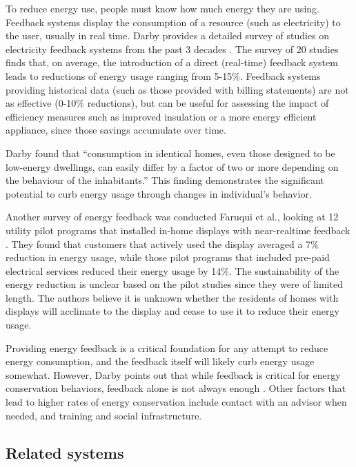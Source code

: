 To reduce energy use, people must know how much energy they are using. Feedback systems display the consumption of a resource (such as electricity) to the user, usually in real time. Darby provides a detailed survey of studies on electricity feedback systems from the past 3 decades \cite{darby-review-2006}. The survey of 20 studies finds that, on average, the introduction of a direct (real-time) feedback system leads to reductions of energy usage ranging from 5-15\%. Feedback systems providing historical data (such as those provided with billing statements) are not as effective (0-10\% reductions), but can be useful for assessing the impact of efficiency measures such as improved insulation or a more energy efficient appliance, since those savings accumulate over time.

Darby found that ``consumption in identical homes, even those designed to be low-energy dwellings, can easily differ by a factor of two or more depending on the behaviour of the inhabitants.'' This finding demonstrates the significant potential to curb energy usage through changes in individual's behavior.

Another survey of energy feedback was conducted Faruqui et al., looking at 12 utility pilot programs that installed in-home displays with near-realtime feedback \cite{Faruqui09}. They found that customers that actively used the display averaged a 7\% reduction in energy usage, while those pilot programs that included pre-paid electrical services reduced their energy usage by 14\%. The sustainability of the energy reduction is unclear based on the pilot studies since they were of limited length. The authors believe it is unknown whether the residents of homes with displays will acclimate to the display and cease to use it to reduce their energy usage.

Providing energy feedback is a critical foundation for any attempt to reduce energy consumption, and the feedback itself will likely curb energy usage somewhat. However, Darby points out that while feedback is critical for energy conservation behaviors, feedback alone is not always enough \cite{darby-2000-making-it-obvious}. Other factors that lead to higher rates of energy conservation include contact with an advisor when needed, and training and social infrastructure.

\subsection{Related systems}

